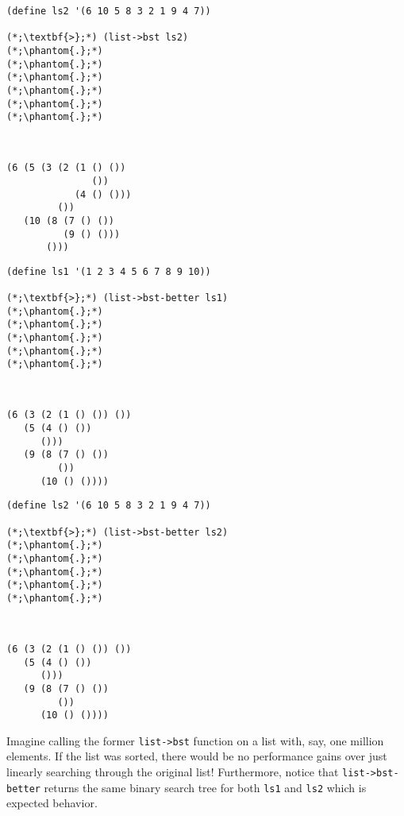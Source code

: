 \begin{cloast}[]{}
\begin{lstlisting}[language=MyScheme]
(define ls2 '(6 10 5 8 3 2 1 9 4 7))

(*;\textbf{>};*) (list->bst ls2)
(*;\phantom{.};*)
(*;\phantom{.};*)
(*;\phantom{.};*)
(*;\phantom{.};*)
(*;\phantom{.};*)
(*;\phantom{.};*)
\end{lstlisting}
\tcblower
\begin{lstlisting}[language=MyVOutput]


(6 (5 (3 (2 (1 () ()) 
               ()) 
            (4 () ())) 
         ()) 
   (10 (8 (7 () ()) 
          (9 () ())) 
       ()))
\end{lstlisting}
\end{cloast}

\begin{cloast}[]{}
\begin{lstlisting}[language=MyScheme]
(define ls1 '(1 2 3 4 5 6 7 8 9 10))

(*;\textbf{>};*) (list->bst-better ls1)
(*;\phantom{.};*)
(*;\phantom{.};*)
(*;\phantom{.};*)
(*;\phantom{.};*)
(*;\phantom{.};*)
\end{lstlisting}
\tcblower
\begin{lstlisting}[language=MyVOutput]


(6 (3 (2 (1 () ()) ()) 
   (5 (4 () ()) 
      ())) 
   (9 (8 (7 () ()) 
         ()) 
      (10 () ())))
\end{lstlisting}
\end{cloast}

\begin{cloast}[]{}
\begin{lstlisting}[language=MyScheme]
(define ls2 '(6 10 5 8 3 2 1 9 4 7))

(*;\textbf{>};*) (list->bst-better ls2)
(*;\phantom{.};*)
(*;\phantom{.};*)
(*;\phantom{.};*)
(*;\phantom{.};*)
(*;\phantom{.};*)
\end{lstlisting}
\tcblower
\begin{lstlisting}[language=MyVOutput]


(6 (3 (2 (1 () ()) ()) 
   (5 (4 () ()) 
      ())) 
   (9 (8 (7 () ()) 
         ()) 
      (10 () ())))
\end{lstlisting}
\end{cloast}

Imagine calling the former \texttt{list->bst} function on a list with, say, one million elements. If the list was sorted, there would be no performance gains over just linearly searching through the original list! Furthermore, notice that \texttt{list->bst-better} returns the same binary search tree for both \texttt{ls1} and \texttt{ls2} which is expected behavior. 

